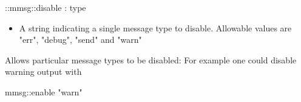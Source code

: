 \begin{code}     
  ::mmsg::disable : type
\end{code}
\begin{itemize}
\item {} A string indicating a single message type to
  disable. Allowable values are "err", "debug", "send" and "warn"
\end{itemize}
Allows particular message types to be disabled: For example one could
disable warning output with
\begin{code}
       mmsg::enable "warn" 
\end{code}

